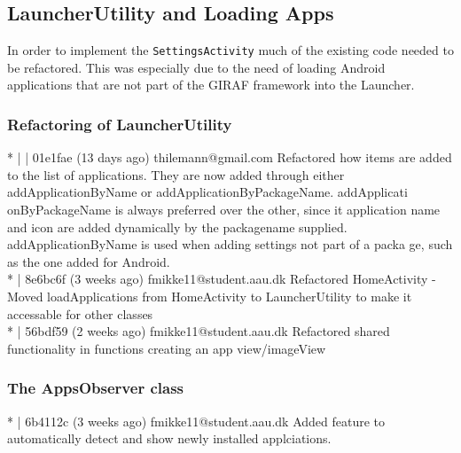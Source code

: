 \subsection{LauncherUtility and Loading Apps}\label{sect:sprint3:refactoring}
In order to implement the \lstinline!SettingsActivity! much of the existing code needed to be refactored.
This was especially due to the need of loading Android applications that are not part of the GIRAF framework  into the Launcher. 

\subsubsection{Refactoring of LauncherUtility}
* | | 01e1fae (13 days ago) thilemann@gmail.com Refactored how items are added to the list of applications. They are now added through either addApplicationByName or addApplicationByPackageName. addApplicati
onByPackageName is always preferred over the other, since it application name and icon are added dynamically by the packagename supplied. addApplicationByName is used when adding settings not part of a packa
ge, such as the one added for Android.\\
* | 8e6bc6f (3 weeks ago) fmikke11@student.aau.dk Refactored HomeActivity - Moved loadApplications from HomeActivity to LauncherUtility to make it accessable for other classes\\
* | 56bdf59 (2 weeks ago) fmikke11@student.aau.dk Refactored shared functionality in functions creating an app view/imageView\\

 \subsubsection{The AppsObserver class}
 * | 6b4112c (3 weeks ago) fmikke11@student.aau.dk Added feature to automatically detect and show newly installed applciations.